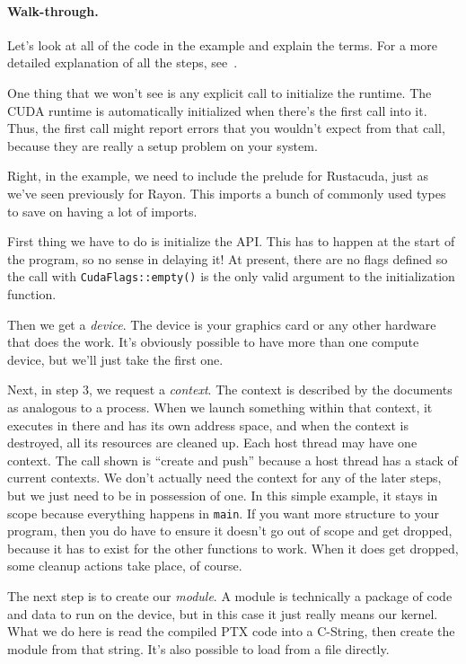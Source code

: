 \paragraph{Walk-through.} Let's look at all of the code in the example and
explain the terms. For a more detailed explanation of all the steps, see~\cite{cuda}.

One thing that we won't see is any explicit call to initialize the runtime. The CUDA runtime is automatically initialized when there's the first call into it. Thus, the first call might report errors that you wouldn't expect from that call, because they are really a setup problem on your system.

Right, in the example, we need to include the prelude for Rustacuda, just as we've seen previously for Rayon. This imports a bunch of commonly used types to save on having a lot of imports. 

First thing we have to do is initialize the API. This has to happen at the start of the program, so no sense in delaying it! At present, there are no flags defined so the call with \texttt{CudaFlags::empty()} is the only valid argument to the initialization function. 

Then we get a \textit{device}. The device is your graphics card or any other hardware that does the work. It's obviously possible to have more than one compute device, but we'll just take the first one. 

Next, in step 3, we request a \emph{context}. The context is described by the documents as analogous to a process. When we launch something within that context, it executes in there and has its own address space, and when the context is destroyed, all its resources are cleaned up. Each host thread may have one context. The call shown is ``create and push'' because a host thread has a stack of current contexts. We don't actually need the context for any of the later steps, but we just need to be in possession of one. In this simple example, it stays in scope because everything happens in \texttt{main}. If you want more structure to your program, then you do have to ensure it doesn't go out of scope and get dropped, because it has to exist for the other functions to work. When it does get dropped, some cleanup actions take place, of course.

The next step is to create our \textit{module}. A module is technically a package of code and data to run on the device, but in this case it just really means our kernel. What we do here is read the compiled PTX code into a C-String, then create the module from that string. It's also possible to load from a file directly. 

